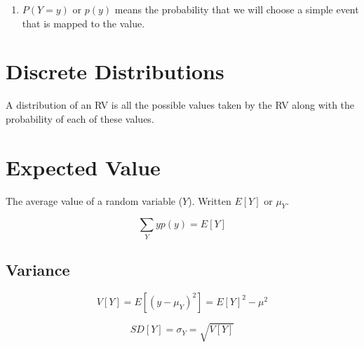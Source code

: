 \documentclass{article}
\begin{document}
\begin{enumerate}
\item $P(Y=y)$ or $p(y)$ means the probability that we will choose a simple
  event that is mapped to the value.
\end{enumerate}

\section{Discrete Distributions}
A distribution of an RV is all the possible values taken by the RV along with
the probability of each of these values.

\section{Expected Value}
The average value of a random variable ($Y$). Written $E[Y]$ or $\mu_Y$.

\begin{equation}
\sum_Y y p(y) = E[Y]
\end{equation}

\subsection{Variance}
\begin{equation}
V[Y] = E[(y-\mu_Y)^2] = E[Y]^2 - \mu^2
\end{equation}

\begin{equation}
SD[Y] = \sigma_Y = \sqrt{V[Y]}
\end{equation}
\end{document}
